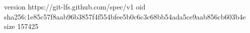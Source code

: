 version https://git-lfs.github.com/spec/v1
oid sha256:1e85c57f8aab96b3857f4f554bfee5b0c6c3c68bb54ada5ce9aab856cb603b4e
size 157425
